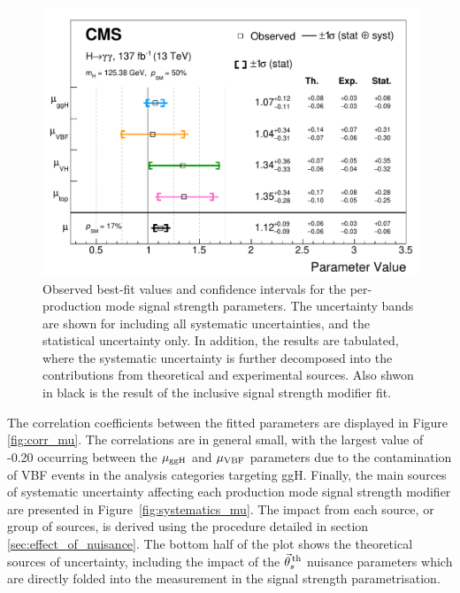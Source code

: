 \begin{figure}[htbp]
  \centering
  \includegraphics[width=1\textwidth]{Figures/hgg_results/mu_summary.pdf}
  \caption[Summary of the signal strength fit results]
  {
    Observed best-fit values and confidence intervals for the per-production mode signal strength parameters. The uncertainty bands are shown for including all systematic uncertainties, and the statistical uncertainty only. In addition, the results are tabulated, where the systematic uncertainty is further decomposed into the contributions from theoretical and experimental sources. Also shwon in black is the result of the inclusive signal strength modifier fit.
  }
  \label{fig:summary_mu}
\end{figure}

The correlation coefficients between the fitted parameters are displayed in Figure \ref{fig:corr_mu}. The correlations are in general small, with the largest value of -0.20 occurring between the $\mu_{\rm{ggH}}$ and $\mu_{\rm{VBF}}$ parameters due to the contamination of VBF events in the analysis categories targeting ggH. Finally, the main sources of systematic uncertainty affecting each production mode signal strength modifier are presented in Figure~\ref{fig:systematics_mu}. The impact from each source, or group of sources, is derived using the procedure detailed in section \ref{sec:effect_of_nuisance}. The bottom half of the plot shows the theoretical sources of uncertainty, including the impact of the $\vec{\theta}^{\,\rm{th}}_{s}$ nuisance parameters which are directly folded into the measurement in the signal strength parametrisation.

